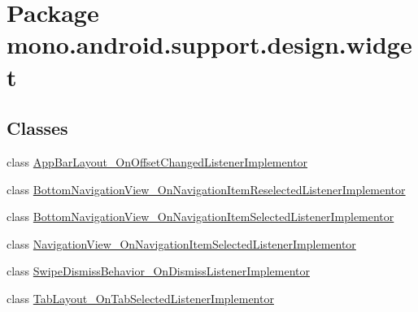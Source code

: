 \hypertarget{namespacemono_1_1android_1_1support_1_1design_1_1widget}{
\section{Package mono.android.support.design.widget}
\label{namespacemono_1_1android_1_1support_1_1design_1_1widget}
}
\subsection*{Classes}
\begin{CompactItemize}
\item 
class \hyperlink{classmono_1_1android_1_1support_1_1design_1_1widget_1_1_app_bar_layout___on_offset_changed_listener_implementor}{AppBarLayout\_\-OnOffsetChangedListenerImplementor}
\item 
class \hyperlink{classmono_1_1android_1_1support_1_1design_1_1widget_1_1_bottom_navigation_view___on_navigation_ibc61d53e910ce9033a3261f22503637c}{BottomNavigationView\_\-OnNavigationItemReselectedListenerImplementor}
\item 
class \hyperlink{classmono_1_1android_1_1support_1_1design_1_1widget_1_1_bottom_navigation_view___on_navigation_ie9d71c6c186664ed279b77f9f21d9a3f}{BottomNavigationView\_\-OnNavigationItemSelectedListenerImplementor}
\item 
class \hyperlink{classmono_1_1android_1_1support_1_1design_1_1widget_1_1_navigation_view___on_navigation_item_selected_listener_implementor}{NavigationView\_\-OnNavigationItemSelectedListenerImplementor}
\item 
class \hyperlink{classmono_1_1android_1_1support_1_1design_1_1widget_1_1_swipe_dismiss_behavior___on_dismiss_listener_implementor}{SwipeDismissBehavior\_\-OnDismissListenerImplementor}
\item 
class \hyperlink{classmono_1_1android_1_1support_1_1design_1_1widget_1_1_tab_layout___on_tab_selected_listener_implementor}{TabLayout\_\-OnTabSelectedListenerImplementor}
\end{CompactItemize}
